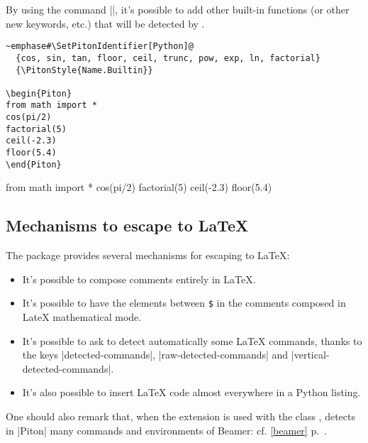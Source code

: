 \documentclass{article}
\begin{document}
\endgroup

\bigskip
By using the command |\SetPitonIdentifier|, it's possible to add other
built-in functions (or other new keywords, etc.) that will be detected by
.


\begin{Verbatim}
~emphase#\SetPitonIdentifier[Python]@
  {cos, sin, tan, floor, ceil, trunc, pow, exp, ln, factorial}
  {\PitonStyle{Name.Builtin}}

\begin{Piton}
from math import *
cos(pi/2) 
factorial(5)
ceil(-2.3) 
floor(5.4) 
\end{Piton}
\end{Verbatim}

\begingroup

  {}

\begin{Piton}
from math import *
cos(pi/2) 
factorial(5)
ceil(-2.3) 
floor(5.4) 
\end{Piton}


\endgroup


\subsection{Mechanisms to escape to LaTeX}


The package  provides several mechanisms for escaping to LaTeX:
\begin{itemize}
\item It's possible to compose comments entirely in LaTeX.
\item It's possible to have the elements between \texttt{\$} in the comments
composed in LateX mathematical mode.
\item It's possible to ask  to detect automatically some LaTeX
commands, thanks to the keys |detected-commands|, |raw-detected-commands| and
|vertical-detected-commands|.
\item It's also possible to insert LaTeX code almost everywhere in a Python listing.
\end{itemize}

One should also remark that, when the extension  is used with the
class ,  detects in |{Piton}| many commands and
environments of Beamer: cf. \ref{beamer} p.~\pageref{beamer}.
\end{document}
